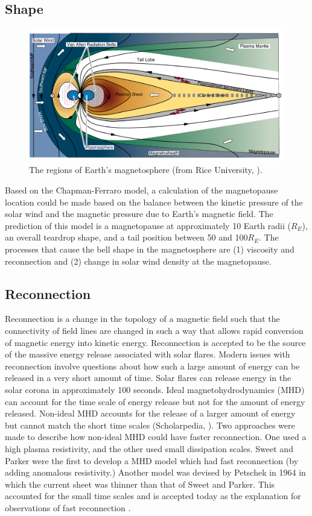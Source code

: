\subsection{Shape}
\begin{figure}
    \centering
    \includegraphics[scale=0.3]{images/Rice_Magnetosphere.jpg}
    \caption{The regions of Earth's magnetosphere (from Rice University,
    \citeyear{Magnetosphere}).}
    \label{fig:Rice_Magneto}
    \figSpace
\end{figure}
Based on the Chapman-Ferraro model, a calculation of the magnetopause
location could be made based on the balance between the kinetic pressure of the
solar wind and the magnetic pressure due to Earth's magnetic field. The
prediction of this model is a magnetopause at approximately 10 Earth radii
($R_E$), an overall teardrop shape, and a tail position between 50 and
100$R_E$. The processes that cause the bell shape in the magnetosphere are (1) viscosity
and reconnection and (2) change in solar wind density at the magnetopause.

\subsection{Reconnection}
Reconnection is a change in the topology of a magnetic field such that the
connectivity of field lines are changed in such a way that allows rapid conversion of
magnetic energy into kinetic energy. Reconnection is accepted to be the
source of the massive energy release associated with solar flares. Modern issues with reconnection involve questions about how such
a large amount of energy can be released in a very short amount of time.
Solar flares can release energy in the solar corona in approximately 100 seconds. Ideal
magnetohydrodynamics (MHD) can account for the time scale of energy release
but not for the amount of energy released. Non-ideal MHD accounts
for the release of a larger amount of energy but cannot match the short time
scales (Scholarpedia, \citeyear{Reconnection}). Two approaches were made to
describe how non-ideal MHD could have faster reconnection. One used a high
plasma resistivity, and the other used small dissipation scales. Sweet and Parker were the first to develop a MHD model
which had fast reconnection (by adding anomalous resistivity.) Another model was
devised by Petschek in 1964 in which the current sheet was thinner than that of
Sweet and Parker. This accounted for the small time scales and is accepted today
as the explanation for observations of fast reconnection \citep{Priest}.

